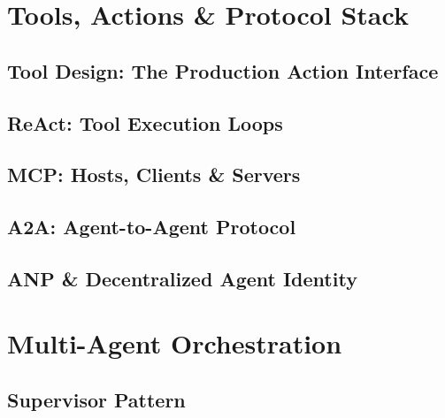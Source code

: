 \part{Tools, Actions \& Protocol Stack}
\label{part:tools}

\chapter{Tool Design: The Production Action Interface}
\label{ch:tool-design}


\chapter{ReAct: Tool Execution Loops}
\label{ch:react}


\chapter{MCP: Hosts, Clients \& Servers}
\label{ch:mcp}


\chapter{A2A: Agent-to-Agent Protocol}
\label{ch:a2a}


\chapter{ANP \& Decentralized Agent Identity}
\label{ch:anp}



\part{Multi-Agent Orchestration}
\label{part:multi-agent}

\chapter{Supervisor Pattern}
\label{ch:supervisor}


